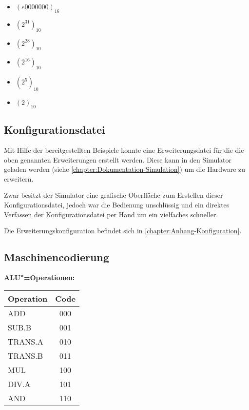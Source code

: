 \begin{itemize}
    \item $(e0000000)_{16}$
    \item $(2^{31})_{10}$
    \item $(2^{28})_{10}$
    \item $(2^{16})_{10}$
    \item $(2^5)_{10}$
    \item $(2)_{10}$
\end{itemize}

\subsection{Konfigurationsdatei}
\label{subsection:Dokumentation-Implementierung-Hardwareerweiterung-Konfigurationsdatei}

Mit Hilfe der bereitgestellten Beispiele konnte eine Erweiterungsdatei für die die oben genannten Erweiterungen erstellt werden. Diese kann in den Simulator geladen werden (siehe \autoref{chapter:Dokumentation-Simulation}) um die Hardware zu erweitern.

Zwar besitzt der Simulator eine grafische Oberfläche zum Erstellen dieser Konfigurationsdatei, jedoch war die Bedienung unschlüssig und ein direktes Verfassen der Konfigurationsdatei per Hand um ein vielfaches schneller.

Die Erweiterungskonfiguration befindet sich in \autoref{chapter:Anhang-Konfiguration}.

\subsection{Maschinencodierung}
\label{subsection:Dokumentation-Implementierung-Hardwareerweiterung-Maschinencodierung}

\textbf{ALU"=Operationen:}

\begin{tabular}{lc}
    Operation & Code \\
    \hline
    ADD       & 000 \\
    SUB.B     & 001 \\
    TRANS.A   & 010 \\
    TRANS.B   & 011 \\
    MUL       & 100 \\
    DIV.A     & 101 \\
    AND       & 110 \\
\end{tabular}

